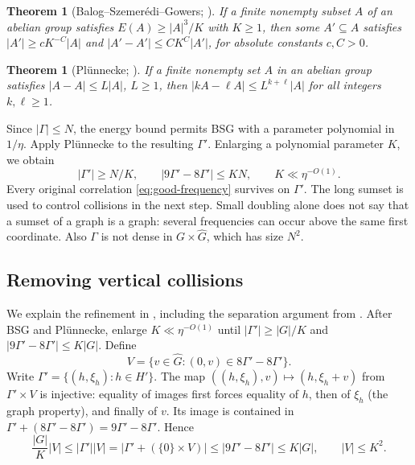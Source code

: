 \documentclass[11pt,a4paper]{article}
\newcommand{\Gh}{\widehat G}
\newcommand{\GT}[1]{\cite[#1]{GT}}
\newtheorem{theorem}[lemma]{Theorem}
\theoremstyle{definition}
\numberwithin{equation}{section}
\begin{document}
\begin{theorem}[Balog--Szemer\'edi--Gowers; {\GT{Theorem 5.2}}]
If a finite nonempty subset $A$ of an abelian group satisfies
$E(A)\geq|A|^3/K$ with $K\geq1$, then some $A'\subseteq A$ satisfies
$|A'|\geq cK^{-C}|A|$ and $|A'-A'|\leq CK^C|A'|$, for absolute
constants $c,C>0$.
\end{theorem}
\begin{theorem}[Pl\"unnecke; {\GT{Theorem 5.3}}]
If a finite nonempty set $A$ in an abelian group satisfies
$|A-A|\leq L|A|$, $L\geq1$, then
$|kA-\ell A|\leq L^{k+\ell}|A|$ for all integers $k,\ell\geq1$.
\end{theorem}
Since $|\Gamma|\leq N$, the energy bound permits BSG with a parameter
polynomial in $1/\eta$. Apply Pl\"unnecke to the resulting $\Gamma'$.
Enlarging a polynomial parameter $K$, we obtain
\begin{equation}\label{eq:small-doubling}
|\Gamma'|\geq N/K,\qquad |9\Gamma'-8\Gamma'|\leq KN,
\qquad K\ll\eta^{-O(1)}.
\end{equation}
Every original correlation \eqref{eq:good-frequency} survives on
$\Gamma'$. The long sumset is used to control collisions in the next
step. Small doubling alone does not say that a sumset of a graph is a
graph: several frequencies can occur above the same first coordinate.
Also $\Gamma$ is not dense in $G\times\Gh$, which has size $N^2$.

\subsection{Removing vertical collisions}
We explain the refinement in \GT{Lemma 9.2}, including the separation
argument from \GT{Lemma 8.3}.
After BSG and Pl\"unnecke, enlarge $K\ll\eta^{-O(1)}$ until
$|\Gamma'|\geq |G|/K$ and $|9\Gamma'-8\Gamma'|\leq K|G|$.
Define
\[V=\{v\in\Gh:(0,v)\in8\Gamma'-8\Gamma'\}.\]
Write $\Gamma'=\{(h,\xi_h):h\in H'\}$. The map
$((h,\xi_h),v)\mapsto(h,\xi_h+v)$ from $\Gamma'\times V$ is injective:
equality of images first forces equality of $h$, then of $\xi_h$ (the
graph property), and finally of $v$. Its image is contained in
$\Gamma'+(8\Gamma'-8\Gamma')=9\Gamma'-8\Gamma'$. Hence
\[\frac{|G|}{K}|V|\leq|\Gamma'||V|
=|\Gamma'+(\{0\}\times V)|\leq|9\Gamma'-8\Gamma'|\leq K|G|,
\qquad |V|\leq K^2.\]
\end{document}
